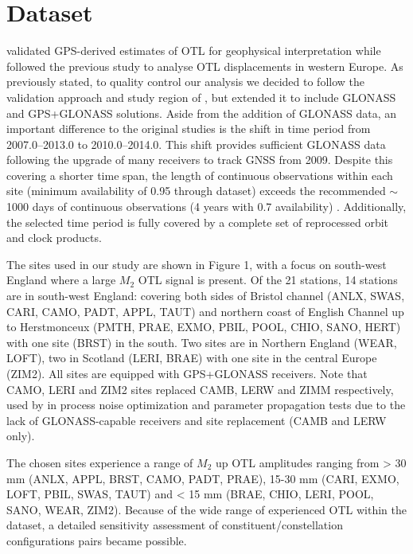 \documentclass[se, manuscript]{copernicus}
\begin{document}
\section{Dataset}
\cite{Penna2015} validated GPS-derived estimates of OTL for geophysical interpretation while \cite{Bos2015} followed the previous study to analyse OTL displacements in western Europe. As previously stated, to quality control our analysis we decided to follow the validation approach and study region of \cite{Penna2015}, but extended it to include GLONASS and GPS+GLONASS solutions. Aside from the addition of GLONASS data, an important difference to the original studies is the shift in time period from 2007.0–2013.0 to 2010.0–2014.0. This shift provides sufficient GLONASS data following the upgrade of many receivers to track GNSS from 2009. Despite this covering a shorter time span, the length of continuous observations within each site (minimum availability of 0.95 through dataset) exceeds the recommended $\sim$1000 days of continuous observations (4 years with 0.7 availability) \citep{Penna2015}. Additionally, the selected time period is fully covered by a complete set of reprocessed orbit and clock products.

The sites used in our study are shown in Figure 1, with a focus on south-west England where a large $M_2$ OTL signal is present. Of the 21 stations, 14 stations are in south-west England: covering both sides of Bristol channel (ANLX, SWAS, CARI, CAMO, PADT, APPL, TAUT) and northern coast of English Channel up to Herstmonceux (PMTH, PRAE, EXMO, PBIL, POOL, CHIO, SANO, HERT) with one site (BRST) in the south. Two sites are in Northern England (WEAR, LOFT), two in Scotland (LERI, BRAE) with one site in the central Europe (ZIM2). All sites are equipped with GPS+GLONASS receivers. Note that CAMO, LERI and ZIM2 sites replaced CAMB, LERW and ZIMM respectively, used by \cite{Penna2015} in process noise optimization and parameter propagation tests due to the lack of GLONASS-capable receivers and site replacement (CAMB and LERW only).

The chosen sites experience a range of $M_2$ up OTL amplitudes ranging from > 30 mm (ANLX, APPL, BRST, CAMO, PADT, PRAE), 15-30 mm (CARI, EXMO, LOFT, PBIL, SWAS, TAUT) and < 15 mm (BRAE, CHIO, LERI, POOL, SANO, WEAR, ZIM2). Because of the wide range of experienced OTL within the dataset, a detailed sensitivity assessment of constituent/constellation configurations pairs became possible.
\end{document}
